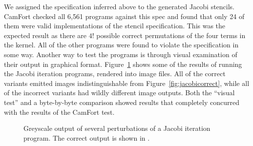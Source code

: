 \documentclass[9pt]{sigplanconf}
\theoremstyle{definition}
\begin{document}
We assigned the specification inferred above to the generated Jacobi
stencils. CamFort checked all 6,561 programs against this spec and found that only 24 of them were
valid implementations of the stencil specification. This was the
expected result as there are $4!$ possible correct permutations
of the four terms in the kernel. All of the other programs were found
to violate the specification in some way. Another way to test the
programs is through visual examination of their output in graphical
format. Figure~\ref{fig:jacobi} shows some of the results of running
the Jacobi iteration programs, rendered into image files. All of the
correct variants emitted images indistinguishable from
Figure~\ref{fig:jacobicorrect}, while all of the incorrect variants
had wildly different image outputs. Both the ``visual test'' and a
byte-by-byte comparison showed results that completely concurred with
the results of the CamFort test.

\begin{figure}[t]
  \centering
  \caption{Greyscale output of several perturbations of a Jacobi
    iteration program. The correct output is shown in
    .}
  \label{fig:jacobi}
\end{figure}
\end{document}

